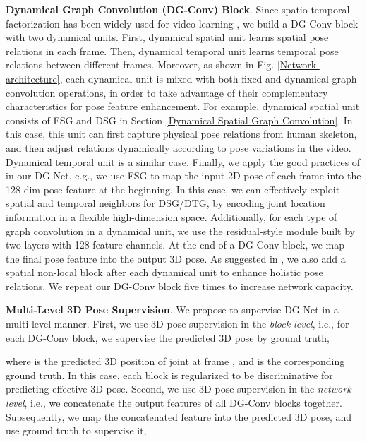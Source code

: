 \documentclass[journal]{IEEEtran}
\begin{document}
\textbf{Dynamical Graph Convolution (DG-Conv) Block}.
Since spatio-temporal factorization has been widely used for video learning \cite{tran2018closer,stgcn},
we build a DG-Conv block with two dynamical units.
First,
dynamical spatial unit learns spatial pose relations in each frame.
Then,
dynamical temporal unit learns temporal pose relations between different frames.
Moreover,
as shown in Fig. \ref{Network-architecture},
each dynamical unit is mixed with both fixed and dynamical graph convolution operations,
in order to take advantage of their complementary characteristics for pose feature enhancement.
For example,
dynamical spatial unit consists of FSG and DSG in Section \ref{Dynamical Spatial Graph Convolution}.
In this case,
this unit can first capture physical pose relations from human skeleton,
and then adjust relations dynamically according to pose variations in the video.
Dynamical temporal unit is a similar case.
Finally,
we apply the good practices of \cite{semanticsgcn} in our DG-Net,
e.g.,
we use FSG to map the input 2D pose of each frame into the 128-dim pose feature at the beginning.
In this case,
we can effectively exploit spatial and temporal neighbors for DSG/DTG,
by encoding joint location information in a flexible high-dimension space.
Additionally,
for each type of graph convolution in a dynamical unit,
we use the residual-style module built by two layers with 128 feature channels.
At the end of a DG-Conv block,
we map the final pose feature into the output 3D pose.
As suggested in \cite{semanticsgcn},
we also add a spatial non-local block after each dynamical unit to enhance holistic pose relations.
We repeat our DG-Conv block five times to increase network capacity.






\textbf{Multi-Level 3D Pose Supervision}.
We propose to supervise DG-Net in a multi-level manner.
First,
we use 3D pose supervision in the \textit{block level},
i.e.,
for each DG-Conv block,
we supervise the predicted 3D pose by ground truth,

where
 is the predicted 3D position of joint  at frame ,
and
 is the corresponding ground truth.
In this case,
each block is regularized to be discriminative for predicting effective 3D pose.
Second,
we use 3D pose supervision in the \textit{network level},
i.e.,
we concatenate the output features of all DG-Conv blocks together.
Subsequently,
we map the concatenated feature into the predicted 3D pose,
and use ground truth to supervise it,
\end{document}
